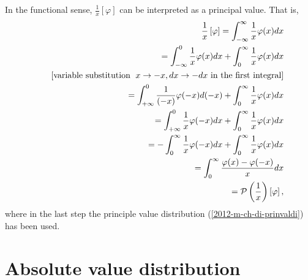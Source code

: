 In the functional sense,
$\frac{1}{x}\left[ \varphi \right]$ can be interpreted as a principal value.
That is,
\begin{equation}
\begin{split}
\frac{1}{x} \left[ \varphi \right]
=
\int_{-\infty}^\infty  \frac{1}{x}  \varphi(x) dx
\\
\qquad
=
\int_{-\infty}^0 \frac{1}{x}   \varphi(x) dx
+
\int_{0}^\infty   \frac{1}{x}   \varphi(x) dx
\\
\qquad
[\textrm{variable substitution }\; x\rightarrow -x, dx \rightarrow -dx \textrm{ in the first integral}]
\\
\qquad
=
\int_{+\infty}^0  \frac{1}{(-x)}    \varphi(-x) d(-x)
+
\int_{0}^\infty    \frac{1}{x}   \varphi(x) dx
\\
\qquad
=
\int_{+\infty}^0  \frac{1}{x}    \varphi(-x) d x
+
\int_{0}^\infty   \frac{1}{x}    \varphi(x) dx
\\
\qquad
=
-\int_0^{\infty}  \frac{1}{x}   \varphi(-x) d x
+
\int_{0}^\infty   \frac{1}{x}    \varphi(x) dx
\\
\qquad
=
\int_{0}^\infty   \frac{ \varphi(x) - \varphi(-x) }{x} dx
\\
\qquad =
{\cal P} \left(\frac{1}{x}\right) \left[\varphi\right]
,
\end{split}
\end{equation}
where in the last step the principle value distribution (\ref{2012-m-ch-di-prinvaldi})
has been used.




\section{Absolute value distribution}


